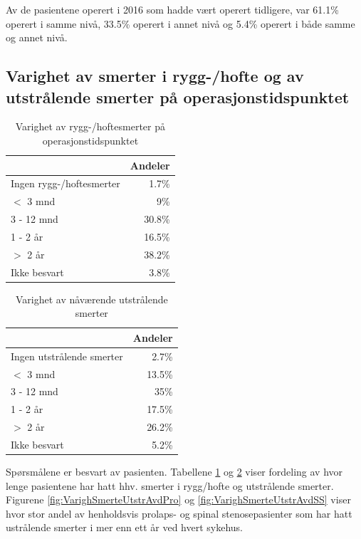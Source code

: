 \documentclass [norsk,a4paper,twoside]{article}\usepackage[]{graphicx}\usepackage[]{color}
\begin{document}
Av de pasientene operert i 2016 som hadde vært operert tidligere, var 61.1\% 
operert i samme nivå, 33.5\% 
operert i annet nivå og 5.4\% 
operert i både samme og annet nivå. 



\subsection{Varighet av smerter i rygg-/hofte og av utstrålende smerter på operasjonstidspunktet}

\begin{table}[ht]
\centering
\begin{tabular}{lr}
  \hline
 & Andeler \\ 
  \hline
Ingen rygg-/hoftesmerter & 1.7\% \\ 
  $<$ 3 mnd & 9\% \\ 
  3 - 12 mnd & 30.8\% \\ 
  1 - 2 år & 16.5\% \\ 
  $>$ 2 år & 38.2\% \\ 
  Ikke besvart & 3.8\% \\ 
   \hline
\end{tabular}
\caption{Varighet av rygg-/hoftesmerter på operasjonstidspunktet} 
\label{tab:SmRH}
\end{table}
\begin{table}[ht]
\centering
\begin{tabular}{lr}
  \hline
 & Andeler \\ 
  \hline
Ingen utstrålende smerter & 2.7\% \\ 
  $<$ 3 mnd & 13.5\% \\ 
  3 - 12 mnd & 35\% \\ 
  1 - 2 år & 17.5\% \\ 
  $>$ 2 år & 26.2\% \\ 
  Ikke besvart & 5.2\% \\ 
   \hline
\end{tabular}
\caption{Varighet av nåværende utstrålende smerter} 
\label{tab:Utstr}
\end{table}

Spørsmålene er besvart av pasienten.
Tabellene \ref{tab:SmRH}  og \ref{tab:Utstr} viser fordeling av hvor lenge pasientene har hatt 
hhv. smerter i rygg/hofte og utstrålende smerter. Figurene \ref{fig:VarighSmerteUtstrAvdPro} og \ref{fig:VarighSmerteUtstrAvdSS} viser hvor stor andel av henholdsvis prolaps- og spinal stenosepasienter som har hatt ustrålende smerter i mer enn ett år ved hvert sykehus. 
\end{document}
